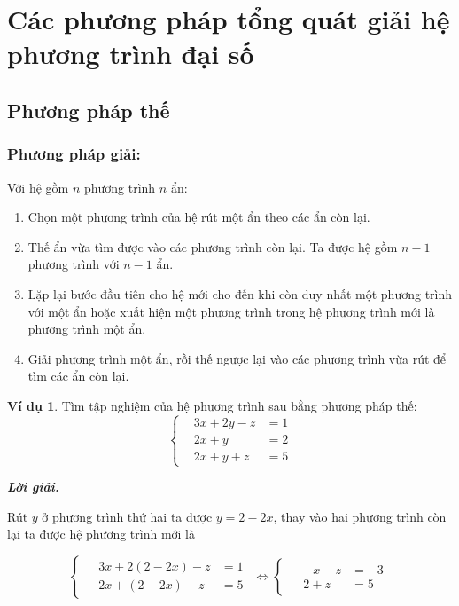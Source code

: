 \documentclass[12pt,a4paper,oneside]{book}
\theoremstyle{theorem}
\theoremstyle{definition}
\newtheorem{vd}[theorem2]{Ví dụ}
\begin{document}
 \section{Các phương pháp tổng quát giải hệ phương trình đại số}   
        \subsection{Phương pháp thế}
       \subsubsection{Phương pháp giải:} Với hệ gồm $ n$ phương trình $n$ ẩn: 
       \begin{enumerate}
       
             \item Chọn một phương trình của hệ rút một ẩn theo các ẩn còn lại.
             \item Thế ẩn vừa tìm được vào các phương trình còn lại. Ta được hệ gồm $n-1$ phương trình với $n-1$ ẩn.
             \item Lặp lại bước đầu tiên cho hệ mới cho đến khi còn duy nhất một phương trình với một ẩn hoặc xuất hiện một phương trình trong hệ phương trình mới là phương trình một ẩn.
             \item Giải phương trình một ẩn, rồi thế ngược lại vào các phương trình vừa rút để tìm các ẩn còn lại.
       \end{enumerate}
       
      
        \begin{vd}
        Tìm tập nghiệm của hệ phương trình sau bằng phương pháp thế:
    \[
\left\{
\begin{aligned}
&3x+2y-z &= 1 \\
&2x+y&= 2 \\
&2x+y+z &= 5
\end{aligned}
\right.
\]
       \end{vd}
         \textbf{\textit{Lời giải.}}
         
         Rút $y$ ở phương trình thứ hai ta được $y=2-2x$, thay vào hai phương trình còn lại ta được hệ phương trình mới là 
 
\[
\begin{cases}
\begin{aligned}
&3x+2(2-2x)-z &= 1 \\
&2x+(2-2x)+z &= 5
\end{aligned}
\end{cases}
\Leftrightarrow
\begin{cases}
\begin{aligned}
&-x-z &= -3 \\
&2 +z&=5
\end{aligned}
\end{cases}
\]
\end{document}
